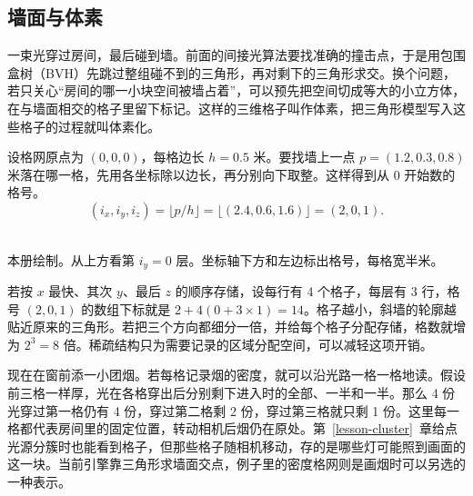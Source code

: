 
\clearpage
\subsection*{墙面与体素}

一束光穿过房间，最后碰到墙。前面的间接光算法要找准确的撞击点，于是用包围盒树（BVH）先跳过整组碰不到的三角形，再对剩下的三角形求交。换个问题，若只关心“房间的哪一小块空间被墙占着”，可以预先把空间切成等大的小立方体，在与墙面相交的格子里留下标记。这样的三维格子叫作体素，把三角形模型写入这些格子的过程就叫体素化。

设格网原点为 $(0,0,0)$，每格边长 $h=0.5$ 米。要找墙上一点 $p=(1.2,0.3,0.8)$ 米落在哪一格，先用各坐标除以边长，再分别向下取整。这样得到从 0 开始数的格号。
\[
 (i_x,i_y,i_z)=\lfloor p/h\rfloor
   =\lfloor(2.4,0.6,1.6)\rfloor=(2,0,1).
\]
\begin{center}
\\
{\small 本册绘制。从上方看第 $i_y=0$ 层。坐标轴下方和左边标出格号，每格宽半米。}
\end{center}

若按 $x$ 最快、其次 $y$、最后 $z$ 的顺序存储，设每行有 4 个格子，每层有 3 行，格号 $(2,0,1)$ 的数组下标就是 $2+4(0+3\times1)=14$。格子越小，斜墙的轮廓越贴近原来的三角形。若把三个方向都细分一倍，并给每个格子分配存储，格数就增为 $2^3=8$ 倍。稀疏结构只为需要记录的区域分配空间，可以减轻这项开销。

现在在窗前添一小团烟。若每格记录烟的密度，就可以沿光路一格一格地读。假设前三格一样厚，光在各格穿出后分别剩下进入时的全部、一半和一半。那么 4 份光穿过第一格仍有 4 份，穿过第二格剩 2 份，穿过第三格就只剩 1 份。这里每一格都代表房间里的固定位置，转动相机后烟仍在原处。第~\ref{lesson-cluster}~章给点光源分簇时也能看到格子，但那些格子随相机移动，存的是哪些灯可能照到画面的这一块。当前引擎靠三角形求墙面交点，例子里的密度格网则是画烟时可以另选的一种表示。


